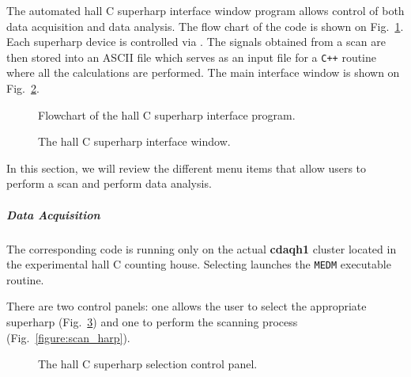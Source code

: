 The automated hall C superharp interface window program allows control of both
data acquisition and data analysis. The flow chart of the code is shown on Fig.~\ref{figure:flow_chart}. 
Each superharp device is controlled via 
. The
signals obtained from a scan are then
stored into an ASCII file which serves as an input file for a {\tt C++} routine where all the
calculations are performed. The main interface window is shown on Fig.~\ref{figure:interface}.

\begin{figure}[!hbt]
\begin{center}
\caption{Flowchart of the hall C superharp interface program.}\label{figure:flow_chart}
\end{center}
\end{figure}

\begin{figure}[!hbt]
\begin{center}
\caption{The hall C superharp interface window.}\label{figure:interface}
\end{center}
\end{figure}

In this section, we will review the different menu items that allow users to perform a scan and
perform data analysis.

	\subparagraph{Data Acquisition}\label{daq}

The corresponding code is running only on the actual {\bf cdaqh1} cluster located in the experimental
hall C counting house. Selecting {\bf{}} launches the {\tt MEDM} executable routine.

There are two control panels: one allows the user to select the appropriate superharp
(Fig.~\ref{figure:choose_harp}) and one to perform the scanning process (Fig.~\ref{figure:scan_harp}).

\begin{figure}[!hbt]
\begin{center}
\caption{The hall C superharp selection control panel.}\label{figure:choose_harp}
\end{center}
\end{figure}


